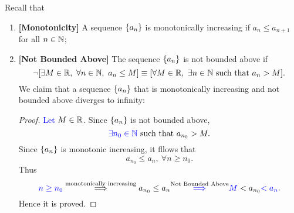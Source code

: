 \documentclass[11pt,openany]{article}
\begin{document}
\begin{note}
	Recall that \begin{enumerate}[]
	\item \textbf{[Monotonicity]} A sequence $\set{a_n}$ is monotonically increasing if $a_n\leq a_{n+1}$ for all $n\in\mathbb{N}$;
	\item \textbf{[Not Bounded Above]} The sequence $\set{a_n}$ is not bounded above if \[
	\lnot[\exists M\in\R,\ \forall n\in\N,\ a_n\leq M]\equiv [\forall M\in\R,\ \exists n\in\N\ \text{such that}\ a_n>M].
	\] We claim that a sequence $\set{a_n}$ that is monotonically increasing and not bounded above diverges to infinity:\par
	\begin{proof}
		\textcolor{blue}{Let $M\in\mathbb{R}$}. Since $\set{a_n}$ is not bounded above, \[
		\textcolor{blue}{\exists n_0\in\mathbb{N}}\ \text{such that}\ a_{n_0}>M.
		\] Since $\set{a_n}$ is monotonic increasing, it fllows that \[
		a_{n_0}\leq a_n,\ \forall n\geq n_0.
		\] Thus \[
		\textcolor{blue}{n\geq n_0}\overset{\text{monotonically increasing}}{\implies} a_{n_0}\leq a_n\overset{\text{Not Bounded Above}}{\textcolor{blue}{\implies}}\textcolor{blue}{M}<a_{n_0}\textcolor{blue}{<a_n}.
		\] Hence it is proved.
	\end{proof}
\end{enumerate}
\end{note}
\end{document}
